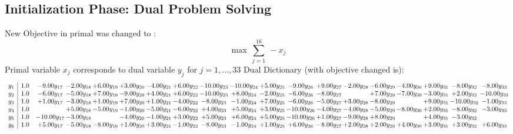 \documentclass[9pt]{article}
\begin{document}
\subsection{Initialization Phase: Dual Problem Solving}
New Objective in primal was changed to : \[ \max\ \sum_{j=1}^{16}\ - x_j \] 
Primal variable $x_j$ corresponds to dual variable $y_j$ for $j = 1,\ldots,33$
Dual Dictionary (with objective changed is): 
\[\begin{array}{c| c c@{\hskip 2pt} c@{\hskip 2pt} c@{\hskip 2pt} c@{\hskip 2pt} c@{\hskip 2pt} c@{\hskip 2pt} c@{\hskip 2pt} c@{\hskip 2pt} c@{\hskip 2pt} c@{\hskip 2pt} c@{\hskip 2pt} c@{\hskip 2pt} c@{\hskip 2pt} c@{\hskip 2pt} c@{\hskip 2pt} c@{\hskip 2pt} c@{\hskip 2pt} }
 y_{1}   &  1.0 & -9.00 y_{17} & -2.00 y_{18} & +  6.00 y_{19} & +  3.00 y_{20} & -4.00 y_{21} & +  6.00 y_{22} & -10.00 y_{23} & -10.00 y_{24} & +  5.00 y_{25} & -9.00 y_{26} & +  9.00 y_{27} & -2.00 y_{28} & -6.00 y_{29} & -4.00 y_{30} & +  9.00 y_{31} & -8.00 y_{32} & -8.00 y_{33}\\
 y_{2}   &  1.0 & -6.00 y_{17} & -5.00 y_{18} & +  7.00 y_{19} & -9.00 y_{20} & +  4.00 y_{21} & +  6.00 y_{22} & -10.00 y_{23} & +  8.00 y_{24} & -2.00 y_{25} & -6.00 y_{26} & -8.00 y_{27} &   & +  7.00 y_{29} & -7.00 y_{30} & -3.00 y_{31} & +  2.00 y_{32} & -10.00 y_{33}\\
 y_{3}   &  1.0 & +  1.00 y_{17} & -3.00 y_{18} & +  1.00 y_{19} & +  7.00 y_{20} & +  1.00 y_{21} & -4.00 y_{22} & -8.00 y_{23} & -1.00 y_{24} & +  7.00 y_{25} & -6.00 y_{26} & -5.00 y_{27} & +  3.00 y_{28} & -8.00 y_{29} &   & +  9.00 y_{31} & -10.00 y_{32} & -1.00 y_{33}\\
 y_{4}   &  1.0  &   & +  5.00 y_{18} & -5.00 y_{19} & -1.00 y_{20} & -5.00 y_{21} & -6.00 y_{22} & +  4.00 y_{23} & +  5.00 y_{24} & +  3.00 y_{25} & -10.00 y_{26} & -4.00 y_{27} & -4.00 y_{28} & -5.00 y_{29} & -8.00 y_{30} & +  2.00 y_{31} & -8.00 y_{32} & -3.00 y_{33}\\
 y_{5}   &  1.0 & -10.00 y_{17} & -3.00 y_{18} &   & -4.00 y_{20} & -1.00 y_{21} & +  3.00 y_{22} & +  5.00 y_{23} & +  6.00 y_{24} & +  5.00 y_{25} & -10.00 y_{26} & +  1.00 y_{27} & -9.00 y_{28} & +  8.00 y_{29} &   & +  4.00 y_{31} & -3.00 y_{32} &   \\
 y_{6}   &  1.0 & +  5.00 y_{17} & -5.00 y_{18} & -8.00 y_{19} & +  1.00 y_{20} & +  3.00 y_{21} & -1.00 y_{22} & -8.00 y_{23} & -1.00 y_{24} & +  1.00 y_{25} & +  6.00 y_{26} & -8.00 y_{27} & +  2.00 y_{28} & +  2.00 y_{29} & +  4.00 y_{30} & +  3.00 y_{31} & +  3.00 y_{32} & +  6.00 y_{33}\\

\end{array}\]
\end{document}
